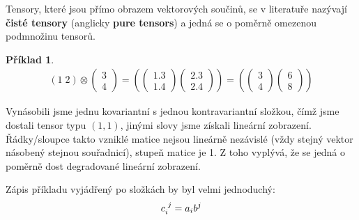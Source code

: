 \documentclass[a5paper,12pt]{amsbook}
\theoremstyle{definition}
\newtheorem{example}{Příklad}[chapter]
\begin{document}
Tensory, které jsou přímo obrazem vektorových součinů, se v literatuře nazývají
\textbf{čisté tensory} (anglicky \textbf{pure tensors}) a jedná se o poměrně omezenou
podmnožinu tensorů.

\begin{example}

\begin{equation*}
\begin{split}
\left(1\;2\right)\otimes\left(\begin{array}{c}3 \\ 4\end{array}\right)
=\left(
\left(\begin{array}{c}
1.3 \\ 1.4
\end{array}\right)
\left(\begin{array}{c}
2.3 \\ 2.4
\end{array}\right)
\right)
=\left(
\left(\begin{array}{c}
3 \\ 4
\end{array}\right)
\left(\begin{array}{c}
6 \\ 8
\end{array}\right)
\right)
\end{split}
\end{equation*}

Vynásobili jsme jednu kovariantní s jednou kontravariantní složkou, čímž jsme dostali
tensor typu $(1, 1)$, jinými slovy jsme získali lineární zobrazení. Řádky/sloupce takto
vzniklé matice nejsou lineárně nezávislé (vždy stejný vektor násobený stejnou
souřadnicí), stupeň matice je 1. Z toho vyplývá, že se jedná o poměrně dost degradované
lineární zobrazení.

Zápis příkladu vyjádřený po složkách by byl velmi jednoduchý:
\begin{equation*}
\begin{split}
c\indices{_i^j} = a_i b^j
\end{split}
\end{equation*}
	
\end{example}
\end{document}
